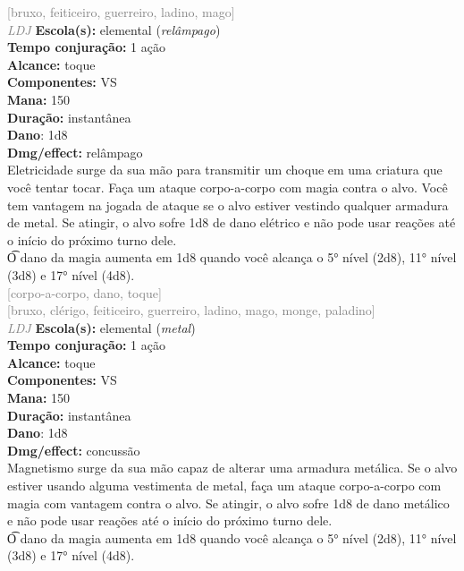 \documentclass{RPG_Adventure}[2021/10/20]
\begin{document}
{\scriptsize \textcolor{gray}{[bruxo, feiticeiro, guerreiro, ladino, mago]\\}}
{\tiny \textcolor{gray}{\textit{LDJ}}}
{\small \t \textbf{Escola(s):} elemental (\textit{relâmpago})\\\t \textbf{Tempo conjuração:} 1 ação\\\t \textbf{Alcance:} toque\\\t \textbf{Componentes:} VS\\\t \textbf{Mana:} 150\\\t \textbf{Duração:} instantânea\\\t \textbf{Dano}: 1d8\\\t \textbf{Dmg/effect:} relâmpago\\}
{\normalsize Eletricidade surge da sua mão para transmitir um choque em uma criatura que você tentar tocar. Faça um ataque corpo-a-corpo com magia contra o alvo. Você tem vantagem na jogada de ataque se o alvo estiver vestindo qualquer armadura de metal. Se atingir, o alvo sofre 1d8 de dano elétrico e não pode usar reações até o início do próximo turno dele.\\\t O dano da magia aumenta em 1d8 quando você alcança o 5° nível (2d8), 11° nível (3d8) e 17° nível (4d8).\\}
{\scriptsize \textcolor{gray}{[corpo-a-corpo, dano, toque]\\}}
{\scriptsize \textcolor{gray}{[bruxo, clérigo, feiticeiro, guerreiro, ladino, mago, monge, paladino]\\}}
{\tiny \textcolor{gray}{\textit{LDJ}}}
{\small \t \textbf{Escola(s):} elemental (\textit{metal})\\\t \textbf{Tempo conjuração:} 1 ação\\\t \textbf{Alcance:} toque\\\t \textbf{Componentes:} VS\\\t \textbf{Mana:} 150\\\t \textbf{Duração:} instantânea\\\t \textbf{Dano}: 1d8\\\t \textbf{Dmg/effect:} concussão\\}
{\normalsize Magnetismo surge da sua mão capaz de alterar uma armadura metálica. Se o alvo estiver usando alguma vestimenta de metal, faça um ataque corpo-a-corpo com magia com vantagem contra o alvo. Se atingir, o alvo sofre 1d8 de dano metálico e não pode usar reações até o início do próximo turno dele.\\\t O dano da magia aumenta em 1d8 quando você alcança o 5° nível (2d8), 11° nível (3d8) e 17° nível (4d8).\\}
\end{document}
